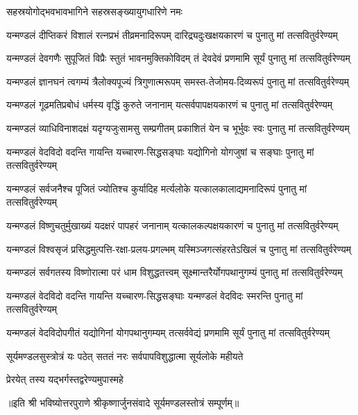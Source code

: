 {सहस्रयोगोद्भवभावभागिने सहस्रसङ्ख्यायुगधारिणे नमः}

\twolineshloka
{यन्मण्डलं दीप्तिकरं विशालं रत्नप्रभं तीव्रमनादिरूपम्}
{दारिद्र्यदुःखक्षयकारणं च पुनातु मां तत्सवितुर्वरेण्यम्}

\twolineshloka
{यन्मण्डलं देवगणैः सुपूजितं   विप्रैः स्तुतं भावनमुक्तिकोविदम्}
{तं देवदेवं प्रणमामि सूर्यं   पुनातु मां तत्सवितुर्वरेण्यम्}

\twolineshloka
{यन्मण्डलं ज्ञानघनं त्वगम्यं   त्रैलोक्यपूज्यं त्रिगुणात्मरूपम्}
{समस्त-तेजोमय-दिव्यरूपं   पुनातु मां तत्सवितुर्वरेण्यम्}

\twolineshloka
{यन्मण्डलं गूढमतिप्रबोधं   धर्मस्य वृद्धिं कुरुते जनानाम्}
{यत्सर्वपापक्षयकारणं च   पुनातु मां तत्सवितुर्वरेण्यम्}

\twolineshloka
{यन्मण्डलं व्याधिविनाशदक्षं   यदृग्यजुःसामसु सम्प्रगीतम्}
{प्रकाशितं येन च भूर्भुवः स्वः   पुनातु मां तत्सवितुर्वरेण्यम्}

\twolineshloka
{यन्मण्डलं वेदविदो वदन्ति   गायन्ति यच्चारण-सिद्धसङ्घाः}
{यद्योगिनो योगजुषां च सङ्घाः   पुनातु मां तत्सवितुर्वरेण्यम्}

\twolineshloka
{यन्मण्डलं सर्वजनैश्च पूजितं   ज्योतिश्च कुर्यादिह मर्त्यलोके}
{यत्कालकालाद्यमनादिरूपं   पुनातु मां तत्सवितुर्वरेण्यम्}

\twolineshloka
{यन्मण्डलं विष्णुचतुर्मुखाख्यं यदक्षरं पापहरं जनानाम्}
{यत्कालकल्पक्षयकारणं च   पुनातु मां तत्सवितुर्वरेण्यम्}

\twolineshloka
{यन्मण्डलं विश्वसृजं प्रसिद्धमुत्पत्ति-रक्षा-प्रलय-प्रगल्भम्}
{यस्मिञ्जगत्संहरतेऽखिलं च   पुनातु मां तत्सवितुर्वरेण्यम्}

\twolineshloka
{यन्मण्डलं सर्वगतस्य विष्णोरात्मा   परं धाम विशुद्धतत्त्वम्}
{सूक्ष्मान्तरैर्योगपथानुगम्यं   पुनातु मां तत्सवितुर्वरेण्यम्}

\twolineshloka
{यन्मण्डलं वेदविदो वदन्ति   गायन्ति यच्चारण-सिद्धसङ्घाः}
{यन्मण्डलं वेदविदः स्मरन्ति   पुनातु मां तत्सवितुर्वरेण्यम्}

\twolineshloka
{यन्मण्डलं वेदविदोपगीतं   यद्योगिनां योगपथानुगम्यम्}
{तत्सर्ववेद्यं  प्रणमामि सूर्यं   पुनातु मां तत्सवितुर्वरेण्यम्}

\twolineshloka
{सूर्यमण्डलसुस्त्रोत्रं यः पठेत् सततं नरः}
{सर्वपापविशुद्धात्मा  सूर्यलोके महीयते}

\closesection

{प्रेरयेत् तस्य यद्भर्गस्तद्वरेण्यमुपास्महे}

॥इति श्री भविष्योत्तरपुराणे श्रीकृष्णार्जुनसंवादे सूर्यमण्डलस्तोत्रं सम्पूर्णम्॥